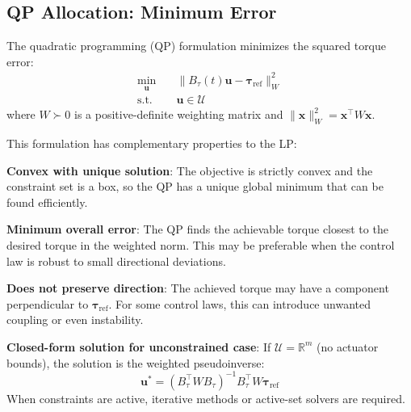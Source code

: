 \documentclass[conference]{IEEEtran}
\begin{document}
\subsection{QP Allocation: Minimum Error}
The quadratic programming (QP) formulation minimizes the squared torque error:
\begin{equation}
\begin{aligned}
\min_{\mathbf{u}} \quad & \|B_\tau(t) \mathbf{u} - \boldsymbol{\tau}_{\text{ref}}\|^2_W \\
\text{s.t.} \quad & \mathbf{u} \in \mathcal{U}
\end{aligned}
\label{eq:qp_allocation}
\end{equation}
where $W \succ 0$ is a positive-definite weighting matrix and $\|\mathbf{x}\|^2_W = \mathbf{x}^\top W \mathbf{x}$.

This formulation has complementary properties to the LP:

\textbf{Convex with unique solution}: The objective is strictly convex and the constraint set is a box, so the QP has a unique global minimum that can be found efficiently.

\textbf{Minimum overall error}: The QP finds the achievable torque closest to the desired torque in the weighted norm. This may be preferable when the control law is robust to small directional deviations.

\textbf{Does not preserve direction}: The achieved torque may have a component perpendicular to $\boldsymbol{\tau}_{\text{ref}}$. For some control laws, this can introduce unwanted coupling or even instability.

\textbf{Closed-form solution for unconstrained case}: If $\mathcal{U} = \mathbb{R}^m$ (no actuator bounds), the solution is the weighted pseudoinverse:
\begin{equation}
\mathbf{u}^* = (B_\tau^\top W B_\tau)^{-1} B_\tau^\top W \boldsymbol{\tau}_{\text{ref}}
\end{equation}
When constraints are active, iterative methods or active-set solvers are required.
\end{document}
